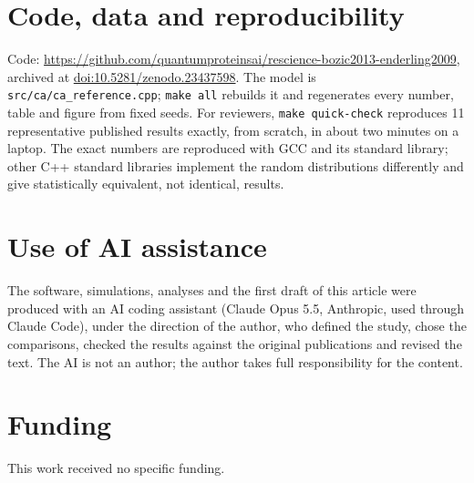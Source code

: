 \section*{Code, data and reproducibility}
Code: \url{https://github.com/quantumproteinsai/rescience-bozic2013-enderling2009}, archived at
\href{https://doi.org/10.5281/zenodo.23437598}{doi:10.5281/zenodo.23437598}. The model is
\texttt{src/ca/ca\_reference.cpp}; \texttt{make all} rebuilds it and regenerates every number,
table and figure from fixed seeds. For reviewers, \texttt{make quick-check} reproduces 11 representative published results exactly, from scratch, in about two minutes on a laptop. The exact numbers are reproduced with GCC and its standard
library; other C++ standard libraries implement the random distributions differently and give
statistically equivalent, not identical, results.

\section*{Use of AI assistance}
The software, simulations, analyses and the first draft of this article were produced with an
AI coding assistant (Claude Opus 5.5, Anthropic, used through Claude Code), under the direction
of the author, who defined the study, chose the comparisons, checked the results against the
original publications and revised the text. The AI is not an author; the author takes full
responsibility for the content.

\section*{Funding}
This work received no specific funding.
